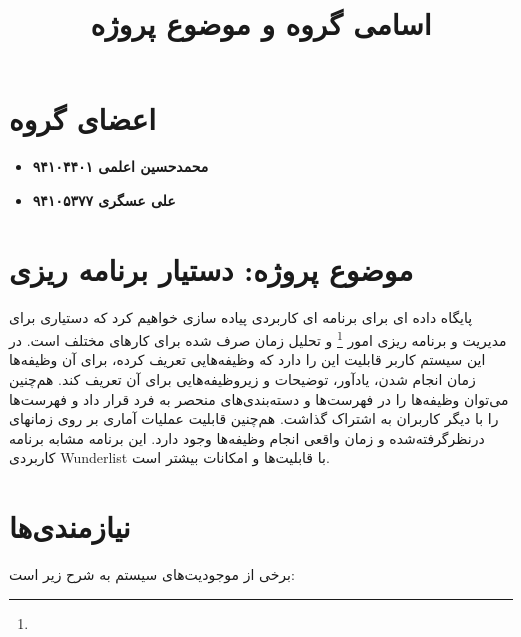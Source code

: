\documentclass{article}
\title{اسامی گروه و موضوع پروژه}
\date{}
\begin{document}
\maketitle

\section*{اعضای گروه}
\vspace{0.5cm}

\begin{itemize}

\item \textbf{محمدحسین اعلمی \hspace{0.5cm} ۹۴۱۰۴۴۰۱}
\item \textbf{علی عسگری \hspace{1.4cm} ۹۴۱۰۵۳۷۷}

\end{itemize}

\section*{موضوع پروژه:‌ دستیار برنامه ریزی}

پایگاه داده ای برای برنامه ای کاربردی پیاده سازی خواهیم کرد که دستیاری برای مدیریت و برنامه ریزی امور
\footnote{}
 و تحلیل زمان صرف شده برای کارهای مختلف است. در این سیستم کاربر قابلیت این را دارد که وظیفه‌هایی تعریف کرده، برای آن وظیفه‌‌ها زمان انجام شدن، یادآور، توضیحات و زیروظیفه‌هایی برای آن تعریف کند. هم‌چنین می‌توان وظیفه‌ها را در فهرست‌ها و دسته‌بندی‌های منحصر به فرد قرار داد و فهرست‌ها را با دیگر کاربران به اشتراک گذاشت. هم‌چنین قابلیت عملیات‌ آماری بر روی زمانهای درنظرگرفته‌شده و زمان واقعی انجام وظیفه‌ها وجود دارد. این برنامه‌ مشابه برنامه کاربردی Wunderlist با قابلیت‌ها و امکانات بیشتر است.
 
\section*{نیازمندی‌ها}	

برخی از موجودیت‌های سیستم به شرح زیر است:
\end{document}
